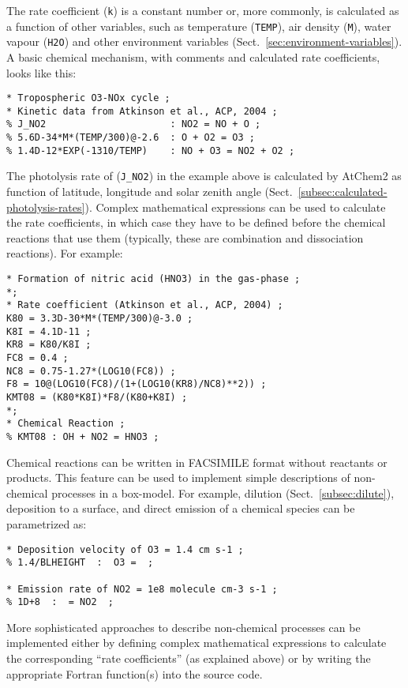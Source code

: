 The rate coefficient (\texttt{k}) is a constant number or, more
commonly, is calculated as a function of other variables, such as
temperature (\texttt{TEMP}), air density (\texttt{M}), water vapour
(\texttt{H2O}) and other environment variables
(Sect.~\ref{sec:environment-variables}). A basic chemical mechanism,
with comments and calculated rate coefficients, looks like this:

\begin{verbatim}
* Tropospheric O3-NOx cycle ;
* Kinetic data from Atkinson et al., ACP, 2004 ;
% J_NO2                      : NO2 = NO + O ;
% 5.6D-34*M*(TEMP/300)@-2.6  : O + O2 = O3 ;
% 1.4D-12*EXP(-1310/TEMP)    : NO + O3 = NO2 + O2 ;
\end{verbatim}

The photolysis rate of  (\texttt{J\_NO2}) in the example above
is calculated by AtChem2 as function of latitude, longitude and solar
zenith angle (Sect.~\ref{subsec:calculated-photolysis-rates}).
Complex mathematical expressions can be used to calculate the rate
coefficients, in which case they have to be defined before the
chemical reactions that use them (typically, these are combination and
dissociation reactions). For example:

\begin{verbatim}
* Formation of nitric acid (HNO3) in the gas-phase ;
*;
* Rate coefficient (Atkinson et al., ACP, 2004) ;
K80 = 3.3D-30*M*(TEMP/300)@-3.0 ;
K8I = 4.1D-11 ;
KR8 = K80/K8I ;
FC8 = 0.4 ;
NC8 = 0.75-1.27*(LOG10(FC8)) ;
F8 = 10@(LOG10(FC8)/(1+(LOG10(KR8)/NC8)**2)) ;
KMT08 = (K80*K8I)*F8/(K80+K8I) ;
*;
* Chemical Reaction ;
% KMT08 : OH + NO2 = HNO3 ;
\end{verbatim}

Chemical reactions can be written in FACSIMILE format without
reactants or products. This feature can be used to implement simple
descriptions of non-chemical processes in a box-model. For example,
dilution (Sect.~\ref{subsec:dilute}), deposition to a surface, and
direct emission of a chemical species can be parametrized as:

\begin{verbatim}
* Deposition velocity of O3 = 1.4 cm s-1 ;
% 1.4/BLHEIGHT  :  O3 =  ;

* Emission rate of NO2 = 1e8 molecule cm-3 s-1 ;
% 1D+8  :  = NO2  ;
\end{verbatim}

More sophisticated approaches to describe non-chemical processes can
be implemented either by defining complex mathematical expressions to
calculate the corresponding ``rate coefficients'' (as explained above)
or by writing the appropriate Fortran function(s) into the source
code.

